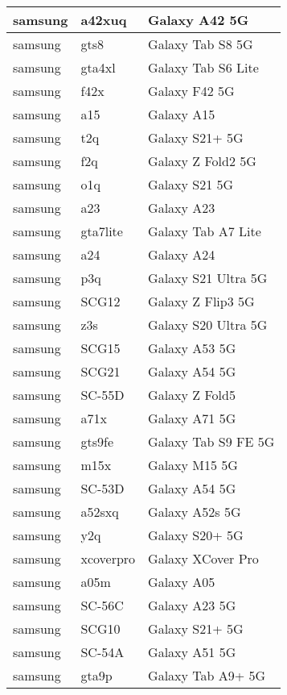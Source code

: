 \begin{tabularx}{\linewidth}{|l|X|X|}
        samsung & a42xuq & Galaxy A42 5G \\ \hline
        samsung & gts8 & Galaxy Tab S8 5G \\ \hline
        samsung & gta4xl & Galaxy Tab S6 Lite \\ \hline
        samsung & f42x & Galaxy F42 5G \\ \hline
        samsung & a15 & Galaxy A15 \\ \hline
        samsung & t2q & Galaxy S21+ 5G \\ \hline
        samsung & f2q & Galaxy Z Fold2 5G \\ \hline
        samsung & o1q & Galaxy S21 5G \\ \hline
        samsung & a23 & Galaxy A23 \\ \hline
        samsung & gta7lite & Galaxy Tab A7 Lite \\ \hline
        samsung & a24 & Galaxy A24 \\ \hline
        samsung & p3q & Galaxy S21 Ultra 5G \\ \hline
        samsung & SCG12 & Galaxy Z Flip3 5G \\ \hline
        samsung & z3s & Galaxy S20 Ultra 5G \\ \hline
        samsung & SCG15 & Galaxy A53 5G \\ \hline
        samsung & SCG21 & Galaxy A54 5G \\ \hline
        samsung & SC-55D & Galaxy Z Fold5 \\ \hline
        samsung & a71x & Galaxy A71 5G \\ \hline
        samsung & gts9fe & Galaxy Tab S9 FE 5G \\ \hline
        samsung & m15x & Galaxy M15 5G \\ \hline
        samsung & SC-53D & Galaxy A54 5G \\ \hline
        samsung & a52sxq & Galaxy A52s 5G \\ \hline
        samsung & y2q & Galaxy S20+ 5G \\ \hline
        samsung & xcoverpro & Galaxy XCover Pro \\ \hline
        samsung & a05m & Galaxy A05 \\ \hline
        samsung & SC-56C & Galaxy A23 5G \\ \hline
        samsung & SCG10 & Galaxy S21+ 5G \\ \hline
        samsung & SC-54A & Galaxy A51 5G \\ \hline
        samsung & gta9p & Galaxy Tab A9+ 5G \\ \hline

\end{tabularx}
